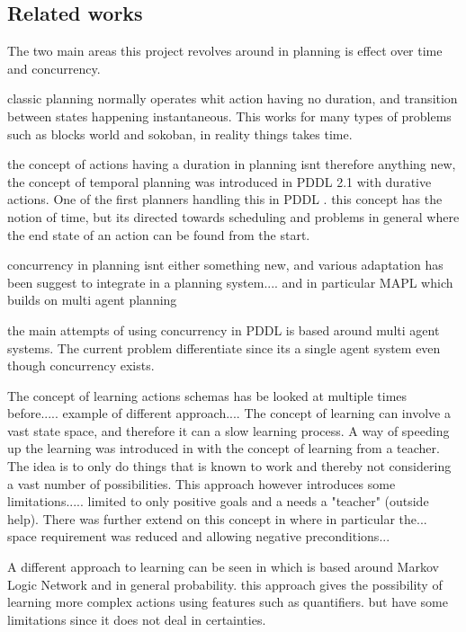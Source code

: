 \subsection{Related works}
The two main areas this project revolves around in planning is effect over time and concurrency. 

classic planning normally operates whit action having no duration, and transition between states happening instantaneous. This works for many types of problems such as blocks world and sokoban, in reality things takes time.

the concept of actions having a duration in planning isnt therefore anything new, the concept of temporal planning was introduced in PDDL 2.1 with durative actions. One of the first planners handling this in PDDL \cite{durative}. this concept has the notion of time, but its directed towards scheduling and problems in general where the end state of an action can be found from the start.
%
%	
%
%	
%	




concurrency in planning isnt either something new, and various adaptation has been suggest to integrate in a planning system.... and in particular MAPL which builds on multi agent planning\cite{mapl}

the main attempts of using concurrency in PDDL is based around multi agent systems. The current problem differentiate since its a single agent system even though concurrency exists. 

The concept of learning actions schemas has be looked at multiple times before..... example of different approach....
The concept of learning can involve a vast state space, and therefore it can  a slow learning process. A way of speeding up the learning was introduced in \cite{Action-Schemas} with the concept of learning from a teacher. The idea is to only do things that is known to work and thereby not considering a vast number of possibilities. This approach however introduces some limitations..... limited to only positive goals and a needs a "teacher" (outside help). There was further extend on this concept in \cite{jacobsen2015a} where in particular the... space requirement was reduced and allowing negative preconditions...

A different approach to learning can be seen in \cite{zhuo2010a} which is based around Markov Logic Network and in general probability. this approach gives the possibility of learning more complex actions using features such as quantifiers. but have some limitations since it does not deal in certainties.
